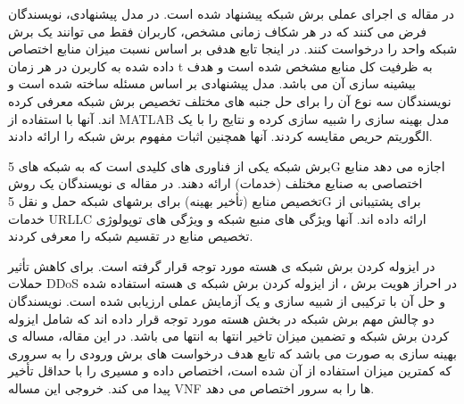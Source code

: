 در مقاله ی 
\cite{onet}
اجرای عملی برش شبکه پیشنهاد شده است.
در مدل پیشنهادی، نویسندگان فرض می کنند که در هر شکاف زمانی مشخص، کاربران فقط می توانند یک برش شبکه واحد را درخواست کنند.
در اینجا تابع هدفی بر اساس نسبت میزان منابع اختصاص داده شده به کاربرن در هر زمان t به ظرفیت کل منابع مشخص شده است و هدف بیشینه سازی آن  می باشد.  
مدل پیشنهادی بر اساس مسئله  ساخته شده است و نویسندگان سه نوع  آن را برای حل جنبه های مختلف تخصیص برش شبکه معرفی کرده اند.
آنها با استفاده از MATLAB مدل بهینه سازی را شبیه سازی کرده و نتایج را با یک الگوریتم حریص مقایسه کردند. آنها همچنین اثبات مفهوم برش شبکه را ارائه دادند.

برش شبکه یکی از فناوری های کلیدی است که به شبکه های 5G اجازه می دهد منابع اختصاصی به صنایع مختلف (خدمات) ارائه دهند.
در مقاله ی
\cite{li2019latency}
نویسندگان یک روش تخصیص منابع (تأخیر بهینه) برای برشهای شبکه حمل و نقل 5G برای پشتیبانی از خدمات URLLC ارائه داده اند.
آنها ویژگی های منبع شبکه و ویژگی های توپولوژی تخصیص منابع در تقسیم شبکه را معرفی کردند.

در 
\citep{vnf1,coreSlice}
ایزوله کردن برش شبکه ی هسته 
مورد توجه قرار گرفته است.
\citep{vnf1}
برای کاهش تأثیر حملات DDoS در احراز هویت برش ، از ایزوله کردن برش شبکه ی هسته استفاده شده و حل آن با ترکیبی از شبیه سازی و یک آزمایش عملی ارزیابی شده است.
نویسندگان
\citep{coreSlice}
دو چالش مهم برش شبکه در بخش هسته مورد توجه قرار داده اند که شامل ایزوله کردن برش شبکه و تضمین میزان تاخیر انتها به انتها می باشد.
در این مقاله، مساله ی بهینه سازی به صورت 
 می باشد که
 تابع هدف درخواست های برش ورودی را به سروری که کمترین میزان استفاده از آن شده است، اختصاص داده و مسیری را با حداقل تأخیر پیدا می کند. خروجی این مساله VNF ها را به سرور اختصاص می دهد.  

